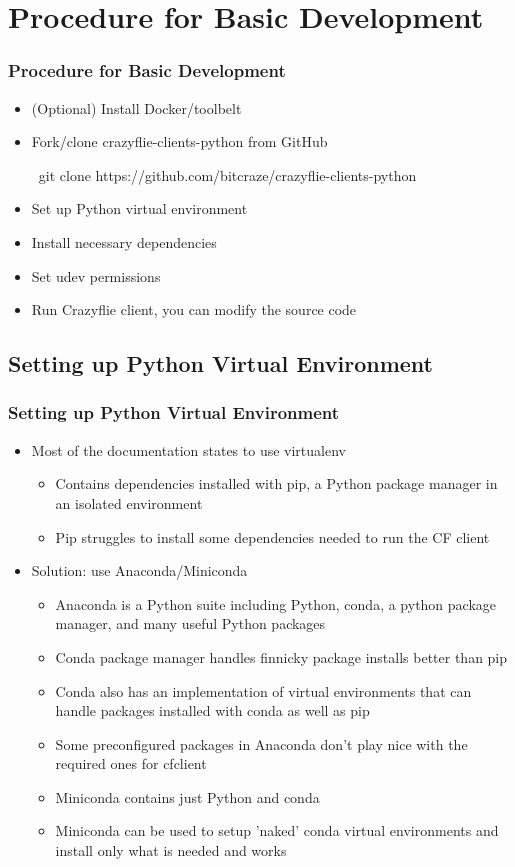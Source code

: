 \documentclass[t, xcolor=dvipsnames]{beamer}
\begin{document}
\section{Procedure for Basic Development}
\begin{frame}
	\frametitle{Procedure for Basic Development}
	\begin{itemize}
		\item (Optional) Install Docker/toolbelt
		\item Fork/clone crazyflie-clients-python from GitHub
			\begin{semiverbatim}
			\ git clone https://github.com/bitcraze/crazyflie-clients-python
			\end{semiverbatim}
		\item Set up Python virtual environment
		\item Install necessary dependencies
		\item Set udev permissions
		\item Run Crazyflie client, you can modify the source code
	\end{itemize}
\end{frame}

\subsection{Setting up Python Virtual Environment}
\begin{frame}
	\frametitle{Setting up Python Virtual Environment}
	\begin{itemize}
		\item Most of the documentation states to use virtualenv
		\begin{itemize}
			\item Contains dependencies installed with pip, a Python package manager in an isolated environment
			\item Pip struggles to install some dependencies needed to run the CF client
		\end{itemize}
		\item Solution: use Anaconda/Miniconda
		\begin{itemize}
			\item Anaconda is a Python suite including Python, conda, a python package manager, and many useful Python packages	
			\item Conda package manager handles finnicky package installs better than pip
			\item Conda also has an implementation of virtual environments that can handle packages installed with conda as well as pip 
			\item Some preconfigured packages in Anaconda don't play nice with the required ones for cfclient
			\item Miniconda contains just Python and conda
			\item Miniconda can be used to setup 'naked' conda virtual environments and install only what is needed and works
		\end{itemize}
	\end{itemize}
\end{frame}
\end{document}
